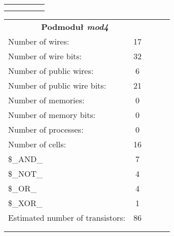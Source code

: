 \begin{table}[!htb]
\begin{minipage}{0.55\linewidth}
\begin{tabular}{lllll}
			&  &  &  &  \\
			&  &  &  & 
		\end{tabular}
	\end{minipage}%
	\begin{minipage}{0.55\linewidth}
		\centering
		\begin{tabular}{lllll}
			\cline{1-2}
			\multicolumn{2}{|c|}{\textbf{Podmoduł \emph{mod4}}} &  &  &  \\ \cline{1-2}
			\multicolumn{1}{|l|}{Number of wires:} & \multicolumn{1}{c|}{17} &  &  &  \\ \cline{1-2}
			\multicolumn{1}{|l|}{Number of wire bits:} & \multicolumn{1}{c|}{32} &  &  &  \\ \cline{1-2}
			\multicolumn{1}{|l|}{Number of public wires:} & \multicolumn{1}{c|}{6} &  &  &  \\ \cline{1-2}
			\multicolumn{1}{|l|}{Number of public wire bits:} & \multicolumn{1}{c|}{21} &  &  &  \\ \cline{1-2}
			\multicolumn{1}{|l|}{Number of memories:} & \multicolumn{1}{c|}{0} &  &  &  \\ \cline{1-2}
			\multicolumn{1}{|l|}{Number of memory bits: } & \multicolumn{1}{c|}{0} &  &  &  \\ \cline{1-2}
			\multicolumn{1}{|l|}{Number of processes: } & \multicolumn{1}{c|}{0} &  &  &  \\ \cline{1-2}
			\multicolumn{1}{|l|}{Number of cells:} & \multicolumn{1}{c|}{16} &  &  &  \\ \cline{1-2}
			\multicolumn{1}{|l|}{\$\_AND\_} & \multicolumn{1}{c|}{7} &  &  &  \\ \cline{1-2}
			\multicolumn{1}{|l|}{\$\_NOT\_} & \multicolumn{1}{c|}{4} &  &  &  \\ \cline{1-2}
			\multicolumn{1}{|l|}{\$\_OR\_} & \multicolumn{1}{c|}{4} &  &  &  \\ \cline{1-2}
			\multicolumn{1}{|l|}{\$\_XOR\_} & \multicolumn{1}{c|}{1} &  &  &  \\ \cline{1-2}
			\multicolumn{1}{|l|}{Estimated number of transistors:} & \multicolumn{1}{c|}{86} &  &  &  \\ \cline{1-2}
			
			&  &  &  &  \\
			&  &  &  & 
		\end{tabular}
	\end{minipage} 
\end{table}

\newpage

